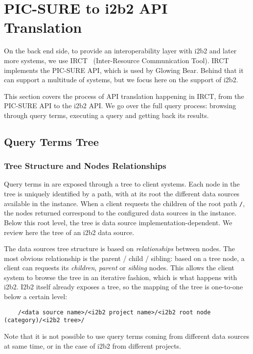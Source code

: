 

\section{PIC-SURE to i2b2 API Translation}
\label{sec:interoplayer-picsure}

On the back end side, to provide an interoperability layer with i2b2 and later more systems, we use IRCT~\cite{todo} (Inter-Resource Communication Tool).
IRCT implements the PIC-SURE API, which is used by Glowing Bear.
Behind that it can support a multitude of systems, but we focus here on the support of i2b2.

This section covers the process of API translation happening in IRCT, from the PIC-SURE API to the i2b2 API.
We go over the full query process: browsing through query terms, executing a query and getting back its results.


\subsection{Query Terms Tree}

\subsubsection{Tree Structure and Nodes Relationships}

Query terms in are exposed through a tree to client systems.
Each node in the tree is uniquely identified by a path, with at its root the different data sources available in the instance.
When a client requests the children of the root path \verb|/|, the nodes returned correspond to the configured data sources in the instance.
Below this root level, the tree is data source implementation-dependent.
We review here the tree of an i2b2 data source.

The data sources tree structure is based on \emph{relationships} between nodes.
The most obvious relationship is the parent / child / sibling: based on a tree node, a client can requests its \emph{children}, \emph{parent} or \emph{sibling} nodes.
This allows the client system to browse the tree in an iterative fashion, which is what happens with i2b2.
I2b2 itself already exposes a tree, so the mapping of the tree is one-to-one below a certain level:
\begin{verbatim}
    /<data source name>/<i2b2 project name>/<i2b2 root node (category)/<i2b2 tree>/
\end{verbatim}
Note that it is not possible to use query terms coming from different data sources at same time, or in the case of i2b2 from different projects.

